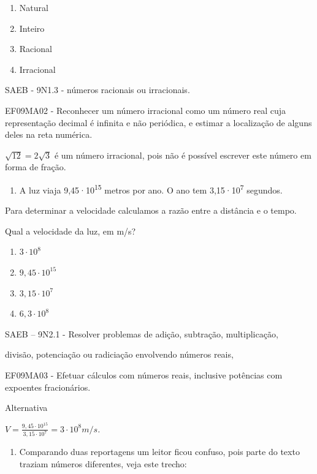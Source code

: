 \begin{escolha}
{{{\begin{escolha}
{{{{{\begin{escolha}
\begin{escolha}
{\begin{q°}
\begin{enumerate}
\item
  Natural
\item
  Inteiro
\item
  Racional
\item
  Irracional
\end{enumerate}

SAEB - 9N1.3 - números racionais ou irracionais.

EF09MA02 - Reconhecer um número irracional como um número real cuja
representação decimal é infinita e não periódica, e estimar a
localização de alguns deles na reta numérica.

\(\sqrt{12} = 2\sqrt{3}\) é um número irracional, pois não é possível
escrever este número em forma de fração.

\begin{enumerate}
\def\labelenumi{\arabic{enumi}.}
\setcounter{enumi}{1}
\tightlist
\item
  A luz viaja 9,45·10\textsuperscript{15} metros por ano. O ano tem
  3,15·10\textsuperscript{7} segundos.
\end{enumerate}

Para determinar a velocidade calculamos a razão entre a distância e o
tempo.

Qual a velocidade da luz, em m/s?

\begin{enumerate}

\item
  \(3 \cdot 10^{8}\)
\item
  \(9,45 \cdot 10^{15}\)
\item
  \(3,15 \cdot 10^{7}\)
\item
  \(6,3 \cdot 10^{8}\)
\end{enumerate}

SAEB -- 9N2.1 - Resolver problemas de adição, subtração, multiplicação,

divisão, potenciação ou radiciação envolvendo números reais,

EF09MA03 - Efetuar cálculos com números reais, inclusive potências com
expoentes fracionários.

Alternativa

\(V = \frac{9,45 \cdot 10^{15}}{3,15 \cdot 10^{7}} = 3 \cdot 10^{8}m/s\)\emph{.}

\begin{enumerate}
\def\labelenumi{\arabic{enumi}.}
\setcounter{enumi}{2}
\tightlist
\item
  Comparando duas reportagens um leitor ficou confuso, pois parte do
  texto traziam números diferentes, veja este trecho:
\end{enumerate}


\end{q°}}
\end{escolha}
\end{escolha}}}}}}
\end{escolha}}}}
\end{escolha}
